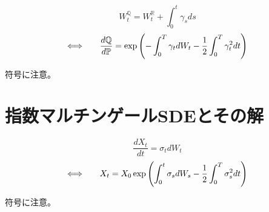 \documentclass[uplatex]{jsarticle}
\begin{document}
\[
	W^{\mathbb{Q}}_{t} = W^{\mathbb{R}}_{t} + \int^{t}_{0} \gamma_{s} ds
\]
\[
	\Longleftrightarrow
	\ \hspace{5mm}
	\frac{d \mathbb{Q}}{d \mathbb{P}}
	=
	\exp \left( - \int^{T}_{0} \gamma_{t} dW_{t} - \frac{1}{2} \int^{T}_{0} \gamma_{t}^{2} dt \right)
\]

符号に注意。


\section{指数マルチンゲールSDEとその解}

\[
	\frac{d X_{t}}{ dt}
	=
	\sigma_{t} d W_{t}
\]
\[
	\Longleftrightarrow
	\ \hspace{5mm}
	X_{t}
	=
	X_{0}
	\exp \left( \int^{t}_{0} \sigma_{s} dW_{s} - \frac{1}{2} \int^{T}_{0} \sigma_{s}^{2} dt \right)
\]

符号に注意。
\end{document}
